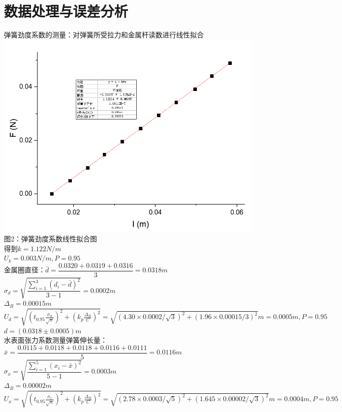 \documentclass{report}
\begin{document}
	\section{数据处理与误差分析}
弹簧劲度系数的测量：对弹簧所受拉力和金属杆读数进行线性拟合\\
\includegraphics[scale=0.6]{11}
\\图2：弹簧劲度系数线性拟合图\\
得到$ k=1.122 N/m $\\
$ U_k=0.003 N/m ,P=0.95 $\\
金属圈直径：$ \bar{d}=\dfrac{0.0320+0.0319+0.0316}{3}=0.0318 m $\\
$ \sigma_{d}=\sqrt{\dfrac{\sum_{i=1}^{3}(d_i-\bar{d})^2}{3-1}}=0.0002 m $\\
$ \Delta_B=0.00015m $\\
$ U_{d}=\sqrt{(t_{0.95}\frac{\sigma_{d}}{\sqrt{n}})^2+(k_p\frac{\Delta_B}{C})^2}=\sqrt{(4.30\times0.0002/\sqrt{3})^2+(1.96\times0.00015/3)^2}m=0.0005m,P=0.95 $\\
$ d=(0.0318\pm0.0005)m $\\
水表面张力系数测量弹簧伸长量：$ \bar{x}=\dfrac{0.0115+0.0118+0.0118+0.0116+0.0111}{5}=0.0116 m $\\
$ \sigma_{x}=\sqrt{\dfrac{\sum_{i=1}^{5}(x_i-\bar{x})^2}{5-1}}=0.0003m $\\
$ \Delta_B=0.00002m $\\
$ U_{x}=\sqrt{(t_{0.95}\frac{\sigma_{x}}{\sqrt{n}})^2+(k_p\frac{\Delta_B}{C})^2}=\sqrt{(2.78\times0.0003/\sqrt{5})^2+(1.645\times0.00002/\sqrt{3})^2}m=0.0004m,P=0.95 $\\
\end{document}
